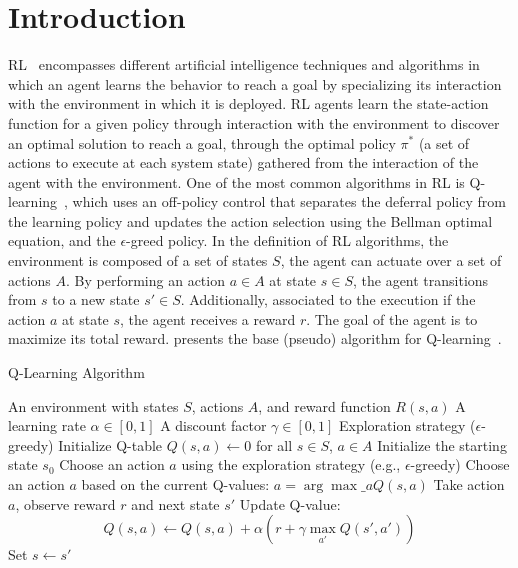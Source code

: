 
\section{Introduction}
\label{sec:problem}

\ac{RL}~\cite{sutton18} encompasses different artificial intelligence techniques and algorithms in 
which an agent learns the behavior to reach a goal by specializing its interaction with the 
environment in which it is deployed.
\ac{RL} agents learn the state-action function for a given policy through interaction with the 
environment to discover an optimal solution to reach a goal, through the optimal policy $\pi^*$ (a set 
of actions to execute at each system state) gathered from the interaction of the agent with the 
environment. One of the most common algorithms in \ac{RL} is Q-learning~\cite{beakcheol19}, which 
uses an off-policy control that separates the deferral policy from the learning policy and updates the 
action selection using the Bellman optimal equation, and the $\epsilon$-greed policy.  In the definition 
of \ac{RL} algorithms, the environment is composed of a set of states $S$, the agent can actuate over 
a set of actions $A$. By performing an action $a\in A$ at state $s \in S$, the agent transitions from $s$
to a new state $s' \in S$. Additionally, associated to the execution if the action $a$ at state $s$, the 
agent receives a reward $r$. The goal of the agent is to maximize its total reward.  
presents the base (pseudo) algorithm for Q-learning~\cite{sutton18}.

\begin{algorithm}
\caption{Q-Learning Algorithm}\label{lst:qlearning}
\begin{algorithmic}
\Require An environment with states $S$, actions $A$, and reward function $R(s, a)$
\Require A learning rate $\alpha \in [0, 1]$
\Require A discount factor $\gamma \in [0, 1]$
\Require Exploration strategy (\eg $\epsilon$-greedy)
\State Initialize Q-table $Q(s, a) \gets 0$ for all $s \in S$, $a \in A$
    \State Initialize the starting state $s_0$
            \State Choose an action $a$ using the exploration strategy (e.g., $\epsilon$-greedy)
        \Else
            \State Choose an action $a$ based on the current Q-values: $a = \arg\max\_a Q(s, a)$
        \EndIf
        \State Take action $a$, observe reward $r$ and next state $s'$
        \State Update Q-value: 
        \[
        Q(s, a) \gets Q(s, a) + \alpha \left( r + \gamma \max_{a'} Q(s', a')\right)
        \]
        \State Set $s \gets s'$
    \EndFor
\EndFor
\end{algorithmic}
\end{algorithm}

